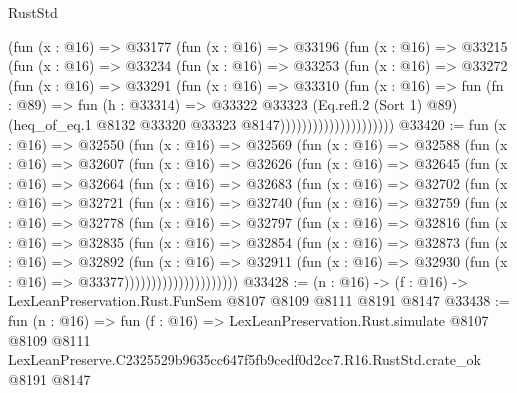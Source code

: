 \begin{lexlean}{RustStd}
\begin{coremodule}
                          (fun (x : @16) =>
                          @33177
                            (fun (x : @16) =>
                            @33196
                              (fun (x : @16) =>
                              @33215
                                (fun (x : @16) =>
                                @33234
                                  (fun (x : @16) =>
                                  @33253
                                    (fun (x : @16) =>
                                    @33272
                                      (fun (x : @16) =>
                                      @33291
                                        (fun (x : @16) =>
                                        @33310
                                          (fun (x : @16) =>
                                          fun (fn : @89) =>
                                          fun (h : @33314) =>
                                          @33322
                                            @33323
                                            (Eq.refl.{2} (Sort 1) @89)
                                            (heq_of_eq.{1}
                                              @8132
                                              @33320
                                              @33323
                                              @8147)))))))))))))))))))))
@33420 := fun (x : @16) =>
  @32550
    (fun (x : @16) =>
    @32569
      (fun (x : @16) =>
      @32588
        (fun (x : @16) =>
        @32607
          (fun (x : @16) =>
          @32626
            (fun (x : @16) =>
            @32645
              (fun (x : @16) =>
              @32664
                (fun (x : @16) =>
                @32683
                  (fun (x : @16) =>
                  @32702
                    (fun (x : @16) =>
                    @32721
                      (fun (x : @16) =>
                      @32740
                        (fun (x : @16) =>
                        @32759
                          (fun (x : @16) =>
                          @32778
                            (fun (x : @16) =>
                            @32797
                              (fun (x : @16) =>
                              @32816
                                (fun (x : @16) =>
                                @32835
                                  (fun (x : @16) =>
                                  @32854
                                    (fun (x : @16) =>
                                    @32873
                                      (fun (x : @16) =>
                                      @32892
                                        (fun (x : @16) =>
                                        @32911
                                          (fun (x : @16) =>
                                          @32930 (fun (x : @16) => @33377)))))))))))))))))))))
@33428 := (n : @16) -> (f : @16) -> LexLeanPreservation.Rust.FunSem @8107 @8109 @8111 @8191 @8147
@33438 := fun (n : @16) =>
  fun (f : @16) =>
  LexLeanPreservation.Rust.simulate
    @8107
    @8109
    @8111
    LexLeanPreserve.C2325529b9635cc647f5fb9cedf0d2cc7.R16.RustStd.crate_ok
    @8191
    @8147
\end{coremodule}
\end{lexlean}
